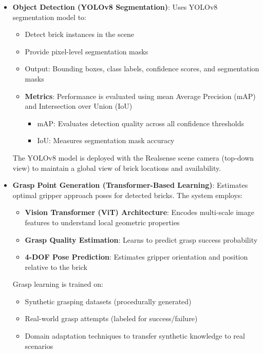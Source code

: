 \begin{itemize}
    \item \textbf{Object Detection (YOLOv8 Segmentation)}: Uses YOLOv8 segmentation model to:
    \begin{itemize}
        \item Detect brick instances in the scene
        \item Provide pixel-level segmentation masks
        \item Output: Bounding boxes, class labels, confidence scores, and segmentation masks
        
        \item \textbf{Metrics}: Performance is evaluated using mean Average Precision (mAP) and Intersection over Union (IoU)
        \begin{itemize}
            \item mAP: Evaluates detection quality across all confidence thresholds
            \item IoU: Measures segmentation mask accuracy
        \end{itemize}
    \end{itemize}
    
    The YOLOv8 model is deployed with the Realsense scene camera (top-down view) to maintain a global view of brick locations and availability.
    
    \item \textbf{Grasp Point Generation (Transformer-Based Learning)}: Estimates optimal gripper approach poses for detected bricks. The system employs:
    \begin{itemize}
        \item \textbf{Vision Transformer (ViT) Architecture}: Encodes multi-scale image features to understand local geometric properties
        \item \textbf{Grasp Quality Estimation}: Learns to predict grasp success probability
        \item \textbf{4-DOF Pose Prediction}: Estimates gripper orientation and position relative to the brick
    \end{itemize}
    
    Grasp learning is trained on:
    \begin{itemize}
        \item Synthetic grasping datasets (procedurally generated)
        \item Real-world grasp attempts (labeled for success/failure)
        \item Domain adaptation techniques to transfer synthetic knowledge to real scenarios
    \end{itemize}
    

\end{itemize}
